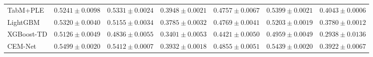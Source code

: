 \begin{table}[tp]
\begin{tabular}{lrrrrrr}
TabM+PLE & $0.5241\pm0.0098$ & $\underline{0.5331\pm0.0024}$ & $\mathbf{0.3948\pm0.0021}$ & $0.4757\pm0.0067$ & $\underline{0.5399\pm0.0021}$ & $\mathbf{0.4043\pm0.0006}$ \\
LightGBM & $0.5320\pm0.0040$ & $0.5155\pm0.0034$ & $0.3785\pm0.0032$ & $0.4769\pm0.0041$ & $0.5203\pm0.0019$ & $0.3780\pm0.0012$ \\
XGBoost-TD & $0.5126\pm0.0049$ & $0.4836\pm0.0055$ & $0.3401\pm0.0053$ & $0.4421\pm0.0050$ & $0.4959\pm0.0049$ & $0.2938\pm0.0136$ \\
CEM-Net & $\mathbf{0.5499\pm0.0020}$ & $\mathbf{0.5412\pm0.0007}$ & $0.3932\pm0.0018$ & $\mathbf{0.4855\pm0.0051}$ & $\mathbf{0.5439\pm0.0020}$ & $0.3922\pm0.0067$ \\
\bottomrule
\end{tabular}
\par{}
\end{table}

